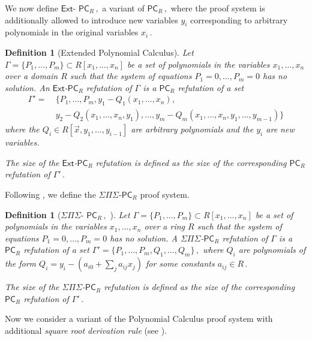 \documentclass[11pt]{article}
\newtheorem{definition}[theorem]{Definition}
\begin{document}
We now define
%
$\mathsf{Ext}$-%
$\mathsf{PC}_{R}\,,$ %
 a variant of %
$\mathsf{PC}_{R}\,,$ %
%
where the proof system is additionally allowed to introduce new variables $y_i$ corresponding to arbitrary polynomials in the original variables %
$x_i\,.$ %


\begin{definition}[Extended Polynomial Calculus]\label{def:Depth-inf-PC}
Let $\Gamma = \{P_1, \ldots, P_m\} \subset R[x_1, \ldots, x_n]$ be a set of polynomials in the variables %
$x_1, \ldots, x_n$ %
 over a domain $R$ such that the system of equations $P_1 = 0, \ldots, P_m = 0$ has no solution. An $\mathsf{Ext}$-$\mathsf{PC}_{R}$ refutation of $\Gamma$ is a $\mathsf{PC}_{R}$ refutation of a set
%
%
%
%
%
\begin{align*}
\Gamma' =& \ \{P_1, \ldots, P_m, y_1 - Q_1(x_1, \ldots, x_n),\\
& \ y_2 - Q_2(x_1, \ldots, x_n, y_1), \ldots,
  y_m - Q_m(x_1, \ldots, x_n, y_1, \ldots, y_{m - 1})\}
\end{align*}   %
where
the  %
$Q_i \in R[\vec{x}, y_1, \ldots, y_{i - 1}]$ are arbitrary polynomials and the $y_i$ are new variables. 

The size of the $\mathsf{Ext}$-$\mathsf{PC}_{R}$ refutation is defined as the size of the corresponding $\mathsf{PC}_{R}$ refutation of %
$\Gamma'\,.$ %
\end{definition}

Following \cite{IMP19_new}, we define the $\Sigma \Pi \Sigma$-$\mathsf{PC}_R$ proof system.

\begin{definition}[$\Sigma \Pi \Sigma$-%
$\mathsf{PC}_R\,,$ %
 \cite{IMP19_new}]\label{def:SPS-PC}
Let $\Gamma = \{P_1, \ldots, P_m\} \subset R[x_1, \ldots, x_n]$ be a set of polynomials in the variables %
$x_1, \ldots, x_n$ %
 over a ring $R$ such that the system of equations $P_1 = 0, \ldots, P_m = 0$ has no solution. A $\Sigma \Pi \Sigma$-$\mathsf{PC}_R$ refutation of $\Gamma$ is a $\mathsf{PC}_{R}$ refutation of a set %
$\Gamma' = \{P_1, \ldots, P_m, Q_1, \ldots, Q_m\}\,,$ %
 where $Q_i$ are polynomials of the form $Q_i = y_i - (a_{i 0} + \sum_j a_{i j} x_j)$ for some constants %
$a_{i j} \in R\,.$ %

The size of the $\Sigma \Pi \Sigma$-$\mathsf{PC}_R$ refutation is defined as the size of the corresponding $\mathsf{PC}_{R}$ refutation of %
$\Gamma'\,.$ %
\end{definition}

Now we consider a variant of
the  %
Polynomial Calculus proof system with additional \emph{square root derivation rule} (see \cite{GH03}). %
%
\end{document}
